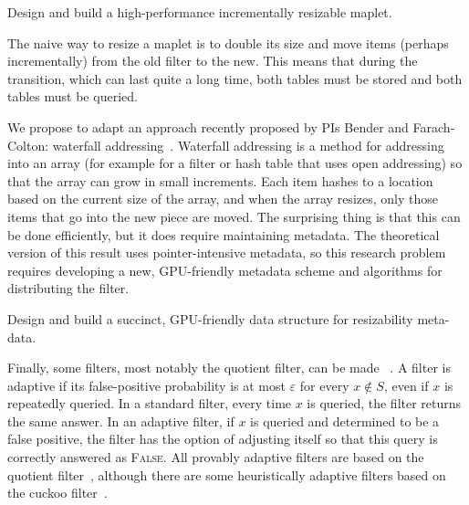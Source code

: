 \begin{rproblem}\label{rprob:resizable-maplet}
Design and build a high-performance incrementally resizable maplet.
\end{rproblem}
The naive way to resize a maplet is to double its size and move items (perhaps incrementally) from the old filter to the new.  This means that during the transition, which can last quite a long time, both tables must be stored and both tables must be queried. 

We propose to adapt an approach recently proposed by PIs Bender and Farach-Colton: waterfall addressing~\cite{Bender2022}.   Waterfall addressing is a method for addressing into an array (for example for a filter or hash table that uses open addressing) so that the array can grow in small increments.  Each item hashes to a location based on the current size of the array, and when the array resizes, only those items that go into the new piece are moved.  The surprising thing is that this can be done efficiently, but it does require maintaining metadata.  The theoretical version of this result uses pointer-intensive metadata, so this research problem requires developing a new, GPU-friendly metadata scheme and algorithms for distributing the filter. \begin{rproblem}\label{rprob:resizable-maplet}
Design and build a succinct, GPU-friendly data structure for resizability meta-data.
\end{rproblem}

Finally, some filters, most notably the quotient filter, can be made ~\cite{BenderFaGo18}.  A filter is adaptive if its false-positive probability is at most $\varepsilon$ for every $x\notin S$, even if $x$ is repeatedly queried.  In a standard filter, every time $x$ is queried, the filter returns the same answer.  In an adaptive filter, if $x$ is queried and determined to be a false positive, the filter has the option of adjusting itself so that this query is correctly answered as \textsc{False}.  All provably adaptive filters are based on the quotient filter~\cite{BenderFaGo18,Lee21}, although there are some heuristically adaptive filters based on the cuckoo filter~\cite{Mitzenmacher2020}.

